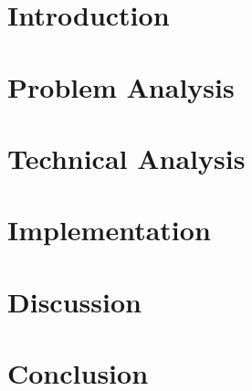 \documentclass[11pt,twoside,titlepage]{report}
\begin{document}
\lhead[\fancyplain{}{\textit{\leftmark}}]{}
\rhead[]{\fancyplain{}{\textit{\leftmark}}}

\thispagestyle{empty}
\newpage
\cleardoublepage
\newpage
\thispagestyle{empty}


\newpage
\thispagestyle{empty}


\cleardoublepage
{}
\renewcommand{\thepage}{\arabic{page}}%
\thispagestyle{empty}
\tableofcontents
\printglossary[type=\acronymtype,nogroupskip,nonumberlist,title=Abbreviations]
\clearpage{\pagestyle{empty}\cleardoublepage}


\chapter{Introduction}
\label{sec:intro}

\chapter{Problem Analysis} \label{sec:problemanalysis}



\chapter{Technical Analysis}






\chapter{Implementation}



\chapter{Discussion}

\chapter{Conclusion}
\end{document}
